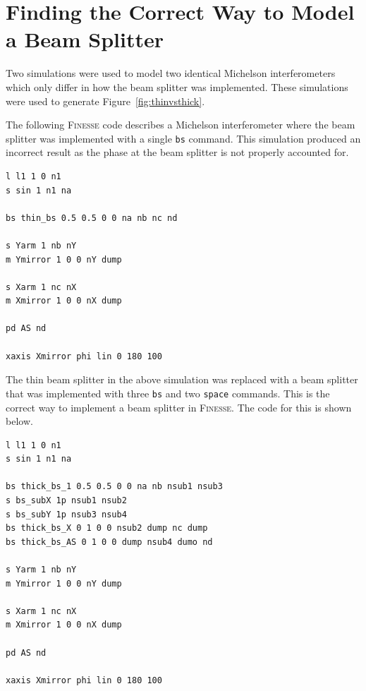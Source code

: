 \section{Finding the Correct Way to Model a Beam Splitter}
Two simulations were used to model two identical Michelson interferometers which only differ in how the beam splitter was implemented. These simulations were used to generate Figure~\ref{fig:thinvsthick}.
\par
The following \textsc{Finesse} code describes a Michelson interferometer where the beam splitter was implemented with a single \texttt{bs} command. This simulation produced an incorrect result as the phase at the beam splitter is not properly accounted for.
\begin{lstlisting}[breaklines]
l l1 1 0 n1 
s sin 1 n1 na 

bs thin_bs 0.5 0.5 0 0 na nb nc nd 

s Yarm 1 nb nY
m Ymirror 1 0 0 nY dump

s Xarm 1 nc nX
m Xmirror 1 0 0 nX dump

pd AS nd

xaxis Xmirror phi lin 0 180 100
\end{lstlisting}
\par
The thin beam splitter in the above simulation was replaced with a beam splitter that was implemented with three \texttt{bs} and two \texttt{space} commands. This is the correct way to implement a beam splitter in \textsc{Finesse}. The code for this is shown below.
\begin{lstlisting}[breaklines]
l l1 1 0 n1 
s sin 1 n1 na 

bs thick_bs_1 0.5 0.5 0 0 na nb nsub1 nsub3
s bs_subX 1p nsub1 nsub2
s bs_subY 1p nsub3 nsub4
bs thick_bs_X 0 1 0 0 nsub2 dump nc dump
bs thick_bs_AS 0 1 0 0 dump nsub4 dumo nd

s Yarm 1 nb nY
m Ymirror 1 0 0 nY dump

s Xarm 1 nc nX
m Xmirror 1 0 0 nX dump

pd AS nd

xaxis Xmirror phi lin 0 180 100
\end{lstlisting}
